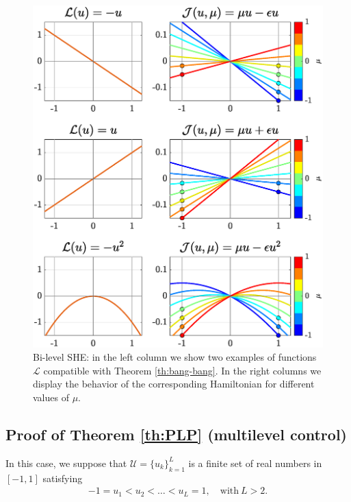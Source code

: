 \documentclass[9pt,shortpaper,twoside,web]{ieeecolor}
\begin{document}
\begin{figure}[h] 
	\centering
	\includegraphics[scale=0.415]{img/fig03.eps}
	\caption{Bi-level SHE: in the left column we show two examples of functions $\mathcal{L}$ compatible with Theorem \ref{th:bang-bang}. In the right columns we display the behavior of the corresponding Hamiltonian for different values of $\mu$.}\label{fig:Bang-Bang-penalization} 
\end{figure}

\subsection{Proof of Theorem \ref{th:PLP} (multilevel control)}\label{sec: proof:PLP}

In this case, we suppose that $\mathcal{U} = \{ u_k\}_{k=1}^L$ is a finite set of real numbers in $[-1,1]$ satisfying
\begin{align}\label{eq:order} 
	-1 = u_1 < u_2 <\ldots <u_L = 1, \quad \text{with} \ L> 2.
\end{align} 
\end{document}
